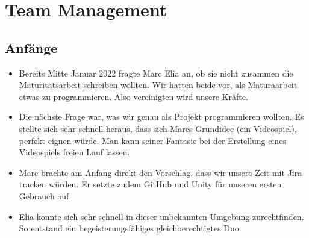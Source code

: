 \chapter{Team Management}

\section{Anfänge}
\begin{itemize}
    \item Bereits Mitte Januar 2022 fragte Marc Elia an, ob sie nicht zusammen die Maturitätsarbeit schreiben wollten. Wir hatten beide vor, als Maturaarbeit etwas zu programmieren. Also vereinigten wird unsere Kräfte.
    \item Die nächste Frage war, was wir genau als Projekt programmieren wollten. Es stellte sich sehr schnell heraus, dass sich Marcs Grundidee (ein Videospiel), perfekt eignen würde. Man kann seiner Fantasie bei der Erstellung eines Videospiels
    freien Lauf lassen.
    \item Marc brachte am Anfang direkt den Vorschlag, dass wir unsere Zeit mit Jira tracken würden. Er setzte zudem GitHub und Unity für unseren ersten Gebrauch auf. 
    \item Elia konnte sich sehr schnell in dieser unbekannten Umgebung zurechtfinden. So entstand ein begeisterungsfähiges gleichberechtigtes Duo.
\end{itemize}

